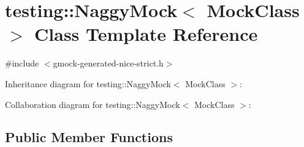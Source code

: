 \hypertarget{classtesting_1_1_naggy_mock}{}\section{testing\+:\+:Naggy\+Mock$<$ Mock\+Class $>$ Class Template Reference}
\label{classtesting_1_1_naggy_mock}


{\ttfamily \#include $<$gmock-\/generated-\/nice-\/strict.\+h$>$}



Inheritance diagram for testing\+:\+:Naggy\+Mock$<$ Mock\+Class $>$\+:


Collaboration diagram for testing\+:\+:Naggy\+Mock$<$ Mock\+Class $>$\+:
\subsection*{Public Member Functions}
